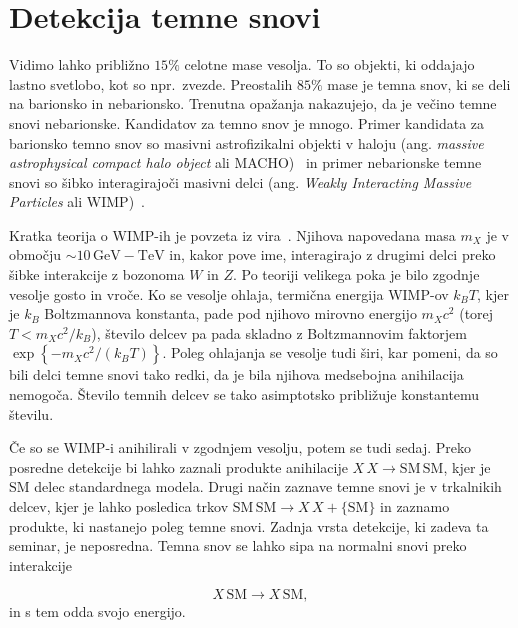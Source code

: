 \section{Detekcija temne snovi}\label{sec:dark}

Vidimo lahko približno \( 15 \% \) celotne mase vesolja. To so objekti, ki oddajajo lastno svetlobo, kot so npr.~zvezde. Preostalih \( 85\% \) mase je temna snov, ki se deli na barionsko in nebarionsko. Trenutna opažanja nakazujejo, da je večino temne snovi nebarionske. Kandidatov za temno snov je mnogo. Primer kandidata za barionsko temno snov so masivni astrofizikalni objekti v haloju (ang. \textit{massive astrophysical compact halo object} ali MACHO)~\cite{jones_introduction_2004} in primer nebarionske temne snovi so šibko interagirajoči masivni delci (ang. \textit{Weakly Interacting Massive Particles} ali WIMP)~\cite{noauthor_delec_2026}.

Kratka teorija o WIMP-ih je povzeta iz vira~\cite{feng_dark_2010}. Njihova napovedana masa \( m_X \) je v območju \( \sim 10 \, \mathrm{GeV} - \mathrm{TeV} \) in, kakor pove ime, interagirajo z drugimi delci preko šibke interakcije z bozonoma \( W \) in \( Z \). Po teoriji velikega poka je bilo zgodnje vesolje gosto in vroče. Ko se vesolje ohlaja, termična energija WIMP-ov \( k_B T \), kjer je \( k_B \) Boltzmannova konstanta, pade pod njihovo mirovno energijo \( m_X c ^2 \) (torej \( T < m_X c ^2 / k_B \)), število delcev pa pada skladno z Boltzmannovim faktorjem \( \exp \left\{ - m_X c ^2 / \left( k_B T \right) \right\} \)\cite{noauthor_boltzmann_nodate}. Poleg ohlajanja se vesolje tudi širi, kar pomeni, da so bili delci temne snovi tako redki, da je bila njihova medsebojna anihilacija nemogoča. Število temnih delcev se tako asimptotsko približuje konstantemu številu.

Če so se WIMP-i anihilirali v zgodnjem vesolju, potem se tudi sedaj. Preko posredne detekcije bi lahko zaznali produkte anihilacije \( X \, X \to \mathrm{SM} \, \mathrm{SM} \), kjer je \( \mathrm{SM} \) delec standardnega modela. Drugi način zaznave temne snovi je v trkalnikih delcev, kjer je lahko posledica trkov \( \mathrm{SM} \, \mathrm{SM} \to X \, X + \{\mathrm{SM}\} \) in zaznamo produkte, ki nastanejo poleg temne snovi. Zadnja vrsta detekcije, ki zadeva ta seminar, je neposredna. Temna snov se lahko sipa na normalni snovi preko interakcije

\[  X \, \mathrm{SM} \to X \, \mathrm{SM},
\]
in s tem odda svojo energijo.

